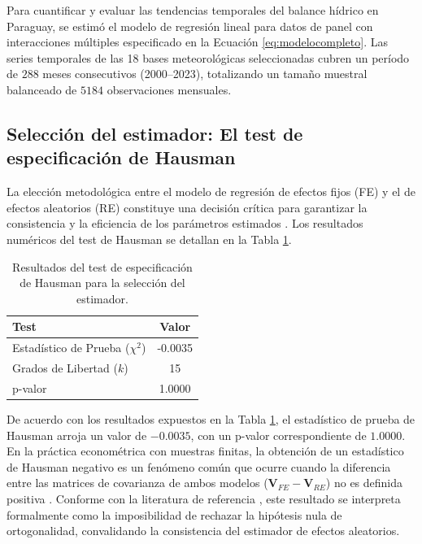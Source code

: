Para cuantificar y evaluar las tendencias temporales del balance hídrico en Paraguay, se estimó el modelo de regresión lineal para datos de panel con interacciones múltiples especificado en la Ecuación \ref{eq:modelocompleto}. Las series temporales de las 18 bases meteorológicas seleccionadas cubren un período de $288$ meses consecutivos (2000--2023), totalizando un tamaño muestral balanceado de $5184$ observaciones mensuales.

\subsection{Selección del estimador: El test de especificación de Hausman}

La elección metodológica entre el modelo de regresión de efectos fijos (FE) y el de efectos aleatorios (RE) constituye una decisión crítica para garantizar la consistencia y la eficiencia de los parámetros estimados \cite{wooldridge2010}. Los resultados numéricos del test de Hausman se detallan en la Tabla \ref{tab:test_hausman}.

\begin{table}[ht!]
\centering
\caption{Resultados del test de especificación de Hausman para la selección del estimador.}
\label{tab:test_hausman}
\vspace{-0.6cm}
\singlespacing %
\small         %
\begin{tabular}{p{6cm}c}
\hline\hline
\textbf{Test} & \textbf{Valor} \\ \hline
Estadístico de Prueba ($\chi^2$) & -0.0035 \\
Grados de Libertad ($k$) & 15 \\
p-valor & 1.0000 \\ \hline\hline
\end{tabular}
\end{table}

De acuerdo con los resultados expuestos en la Tabla \ref{tab:test_hausman}, el estadístico de prueba de Hausman arroja un valor de $-0.0035$, con un p-valor correspondiente de $1.0000$. En la práctica econométrica con muestras finitas, la obtención de un estadístico de Hausman negativo es un fenómeno común que ocurre cuando la diferencia entre las matrices de covarianza de ambos modelos ($\boldsymbol{V}_{FE} - \boldsymbol{V}_{RE}$) no es definida positiva \cite{baltagi2021}. Conforme con la literatura de referencia \cite{hausman1981}, este resultado se interpreta formalmente como la imposibilidad de rechazar la hipótesis nula de ortogonalidad, convalidando la consistencia del estimador de efectos aleatorios.

